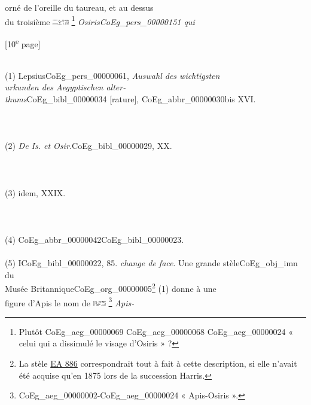 \documentclass{book}
\begin{document}
{\begin{paracol}{2}
{orné de l’oreille du taureau}, et au dessus\\
du troisième \includegraphics[height=6pt]{CoEg_Mariette_hiero_1857-04-01_9_5.png} \footnote{Plutôt \foreignlanguage{translit}{\gls{CoEg_aeg_00000069} \gls{CoEg_aeg_00000068} \gls{CoEg_aeg_00000024}} « celui qui a dissimulé le visage d'Osiris » ?} \textit{Osiris\gls{CoEg_pers_00000151} qui}
\end{paracol}

{\footnotesize\begin{center} {[10\textsuperscript{e} page]}\end{center}}

\begin{paracol}{2}
\noindent \\
(1) Lepsius\gls{CoEg_pers_00000061}, \textit{Auswahl des wichtigsten\\
urkunden des Aegyptischen alter-\\
thums}\gls{CoEg_bibl_00000034} [rature], \gls{CoEg_abbr_00000030bis} XVI.\\
\\
\\
\\
(2) \textit{De Is. et Osir.}\gls{CoEg_bibl_00000029}, XX.\\
\\
\\
\\
(3) idem, XXIX.\\
\\
\\
\\
(4) \Gls{CoEg_abbr_00000042}\gls{CoEg_bibl_00000023}.\\
\\
(5) I\gls{CoEg_bibl_00000022}, 85.
\switchcolumn
\noindent \textit{change de face}. Une grande stèle\gls{CoEg_obj_imn} du\\
Musée Britannique\gls{CoEg_org_00000005}\footnote{La stèle \href{https://www.britishmuseum.org/collection/object/Y_EA886}{EA 886} correspondrait tout à fait à cette description, si elle n'avait été acquise qu'en 1875 lors de la succession Harris.} (1) donne à une\\
figure d’Apis le nom de \includegraphics[height=6pt]{CoEg_Mariette_hiero_1857-04-01_10_1.png} \footnote{\foreignlanguage{translit}{\gls{CoEg_aeg_00000002}-\gls{CoEg_aeg_00000024}} « Apis-Osiris ».} \textit{Apis-\\
}
\end{paracol}}
\end{document}
